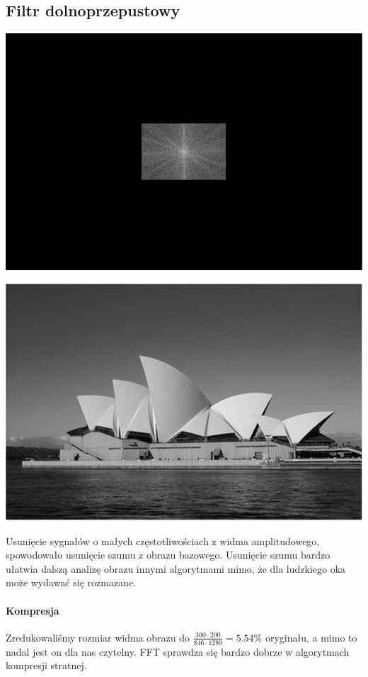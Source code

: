\documentclass{article}
\begin{document}
	
	\subsection{Filtr dolnoprzepustowy}
		\begin{center}
			\includegraphics[width=\linewidth]{../../lab04/mask.png}
		\end{center}
		\begin{center}
			\includegraphics[width=\linewidth]{../../lab04/mask_applied.png}
		\end{center}
	Usunięcie sygnałów o małych częstotliwościach z widma amplitudowego, spowodowało usunięcie szumu z obrazu bazowego. Usunięcie szumu bardzo ułatwia dalszą analizę obrazu innymi algorytmami mimo, że dla ludzkiego oka może wydawać się rozmazane.
	\paragraph{Kompresja}
	Zredukowaliśmy rozmiar widma obrazu do $\frac{300 \cdot 200}{846 \cdot 1280} = 5.54\%$ oryginału, a mimo to nadal jest on dla nas czytelny. FFT sprawdza się bardzo dobrze w algorytmach kompresji stratnej.
	
\end{document}
